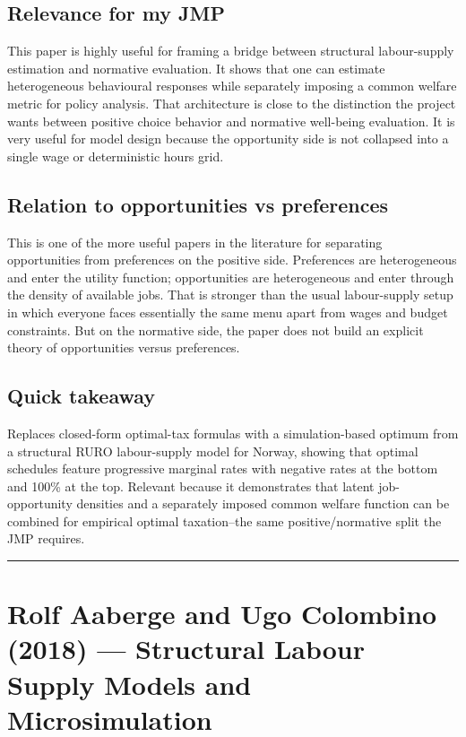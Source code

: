 \documentclass[11pt,a4paper]{article}
\begin{document}
\subsection*{Relevance for my JMP}
This paper is highly useful for framing a bridge between structural labour-supply estimation and normative evaluation. It shows that one can estimate heterogeneous behavioural responses while separately imposing a common welfare metric for policy analysis. That architecture is close to the distinction the project wants between positive choice behavior and normative well-being evaluation. It is very useful for model design because the opportunity side is not collapsed into a single wage or deterministic hours grid.

\subsection*{Relation to opportunities vs preferences}
This is one of the more useful papers in the literature for separating opportunities from preferences on the positive side. Preferences are heterogeneous and enter the utility function; opportunities are heterogeneous and enter through the density of available jobs. That is stronger than the usual labour-supply setup in which everyone faces essentially the same menu apart from wages and budget constraints. But on the normative side, the paper does not build an explicit theory of opportunities versus preferences.

\subsection*{Quick takeaway}
Replaces closed-form optimal-tax formulas with a simulation-based optimum from a structural RURO labour-supply model for Norway, showing that optimal schedules feature progressive marginal rates with negative rates at the bottom and 100\% at the top. Relevant because it demonstrates that latent job-opportunity densities and a separately imposed common welfare function can be combined for empirical optimal taxation--the same positive/normative split the JMP requires.


\medskip\hrule\medskip

\section*{Rolf Aaberge and Ugo Colombino (2018) — Structural Labour Supply Models and Microsimulation}
\end{document}
